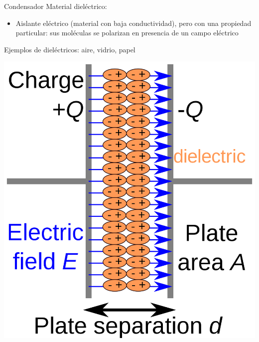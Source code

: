 \documentclass[aspectratio=169, xcolor={usenames,svgnames,dvipsnames}]{beamer}
\begin{document}

\begin{frame}{Condensador}
    \vspace{3mm}
    Material \alert{dieléctrico}: 
    
    \begin{itemize}
        \item Aislante eléctrico (material con baja conductividad), pero con una propiedad particular: sus \alert{moléculas se polarizan} en presencia de un campo eléctrico 
    \end{itemize}

    \vspace{1mm}
    \alert{Ejemplos} de dieléctricos: aire, vidrio, papel
    
    \vspace{1mm}
    
    \begin{center}
        \includegraphics[height=0.55\textheight]{../figs/capacitor_dielectric.png}
    \end{center}
\end{frame}
\end{document}

